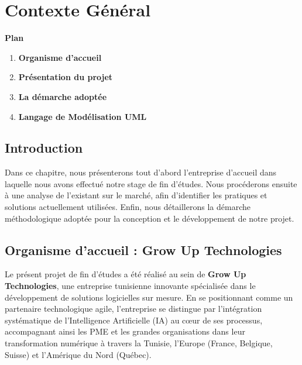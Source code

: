 \chapter{Contexte Général}

\vspace{2.5cm}

\noindent \textbf{\Large Plan}
\vspace{0.8cm}

\begin{enumerate}[label=\textbf{\arabic*}, leftmargin=1.5cm, labelsep=0.8cm]
    \item \textbf{Organisme d'accueil} \dotfill \pageref{sec:organisme}
    \item \textbf{Présentation du projet} \dotfill \pageref{sec:presentation}
    \item \textbf{La démarche adoptée} \dotfill \pageref{sec:demarche}
    \item \textbf{Langage de Modélisation UML} \dotfill \pageref{sec:uml}
\end{enumerate}

\vfill
\newpage

\section*{Introduction}
Dans ce chapitre, nous présenterons tout d'abord l'entreprise d'accueil dans laquelle nous avons effectué notre stage de fin d'études. Nous procéderons ensuite à une analyse de l'existant sur le marché, afin d'identifier les pratiques et solutions actuellement utilisées. Enfin, nous détaillerons la démarche méthodologique adoptée pour la conception et le développement de notre projet.

\section{Organisme d'accueil : Grow Up Technologies}\label{sec:organisme}

Le présent projet de fin d'études a été réalisé au sein de \textbf{Grow Up Technologies}, une entreprise tunisienne innovante spécialisée dans le développement de solutions logicielles sur mesure. En se positionnant comme un partenaire technologique agile, l'entreprise se distingue par l'intégration systématique de l'Intelligence Artificielle (IA) au cœur de ses processus, accompagnant ainsi les PME et les grandes organisations dans leur transformation numérique à travers la Tunisie, l'Europe (France, Belgique, Suisse) et l'Amérique du Nord (Québec).

